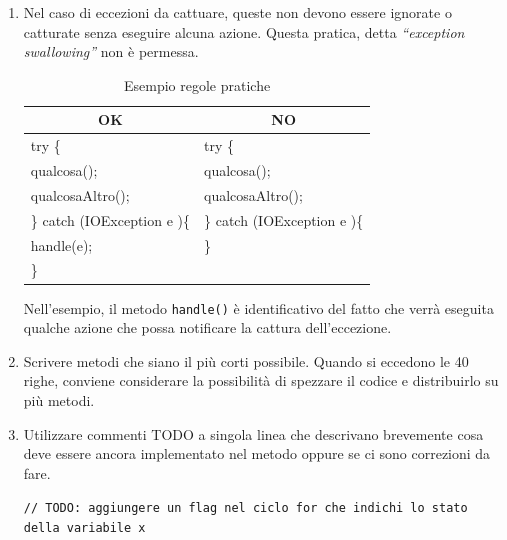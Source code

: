 \begin{enumerate}
	\item Nel caso di eccezioni da cattuare, queste non devono essere ignorate o catturate senza eseguire alcuna azione. Questa pratica, detta \emph{“exception swallowing”} non è permessa. 
	\begin{table} [H]
		\begin{center}
			\begin{tabular}{ | l | l |}
				\multicolumn{1}{c}{\textbf{OK}}&\multicolumn{1}{c}{\textbf{NO}}\\ 
				\hline
				try \{	& try \{\\
				\hspace{0.5cm} qualcosa(); & \hspace{0.5cm} qualcosa();\\
				\hspace{0.5cm} qualcosaAltro(); & \hspace{0.5cm} qualcosaAltro();\\
			    \} catch (IOException e )\{  & \} catch (IOException e )\{\\
			    \hspace{0.5cm} handle(e); & \}\\
			    \}&\\
	   			\hline
			\end{tabular}
		\end{center}
		\caption{Esempio regole pratiche}
	\end{table}
	Nell’esempio, il metodo \texttt{handle()} è identificativo del fatto che verrà eseguita qualche azione che possa notificare la cattura dell’eccezione.
	\item Scrivere metodi che siano il più corti possibile. Quando si eccedono le 40 righe, conviene considerare la possibilità di spezzare il codice e distribuirlo su più metodi.
	\item Utilizzare commenti TODO a singola linea che descrivano brevemente cosa deve essere ancora implementato nel metodo oppure se ci sono correzioni da fare.  
	
	\begin{flushleft}
	\texttt{// TODO: aggiungere un flag nel ciclo for che indichi lo stato della variabile x}
	\end{flushleft}

\end{enumerate}
